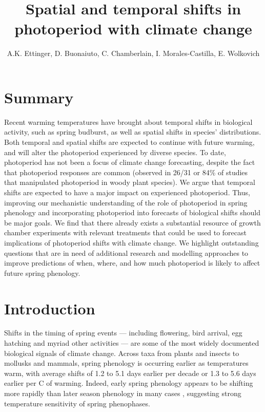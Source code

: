 \documentclass{article}
\begin{document}
 
\title{Spatial and temporal shifts in photoperiod with climate change} %

\author{A.K. Ettinger, D. Buonaiuto, C. Chamberlain, I. Morales-Castilla, E. Wolkovich}
\maketitle  %


\section*{Summary}
Recent warming temperatures have brought about temporal shifts in biological activity, such as spring budburst, as well as spatial shifts in species' distributions. Both temporal and spatial shifts are expected to continue with future warming, and will alter the photoperiod experienced by diverse species. To date, photoperiod has not been a focus of climate change forecasting, despite the fact that photoperiod responses are common (observed in 26/31 or 84\% of studies that manipulated photoperiod in woody plant species). We argue that temporal shifts are expected to have a major impact on experienced photoperiod. Thus, improving our mechanistic understanding of the role of photoperiod in spring phenology and incorporating photoperiod into forecasts of biological shifts should be major goals. We find that there already exists a substantial resource of growth chamber experiments with relevant treatments that could be used to forecast implications of photoperiod shifts with climate change. We highlight outstanding questions that are in need of additional research and modelling approaches to improve predictions of when, where, and how much photoperiod is likely to affect future spring phenology.

\section*{Introduction}
\par Shifts in the timing of spring events --- including flowering, bird arrival, egg hatching and myriad other activities --- are some of the most widely documented biological signals of climate change. Across taxa from plants and insects to mollusks and mammals, spring phenology is occurring earlier as temperatures warm, with average shifts of 1.2 to 5.1 days earlier per decade \citep{bradley1999,parmesan2003, root2003} or 1.3 to 5.6 days earlier per \degree C of warming\citep{wolkovich2012,polgar2013}. Indeed, early spring phenology appears to be shifting more rapidly than later season phenology in many cases \citep{bradley1999,menzel2006}, suggesting strong temperature sensitivity of spring phenophases.
\end{document}
